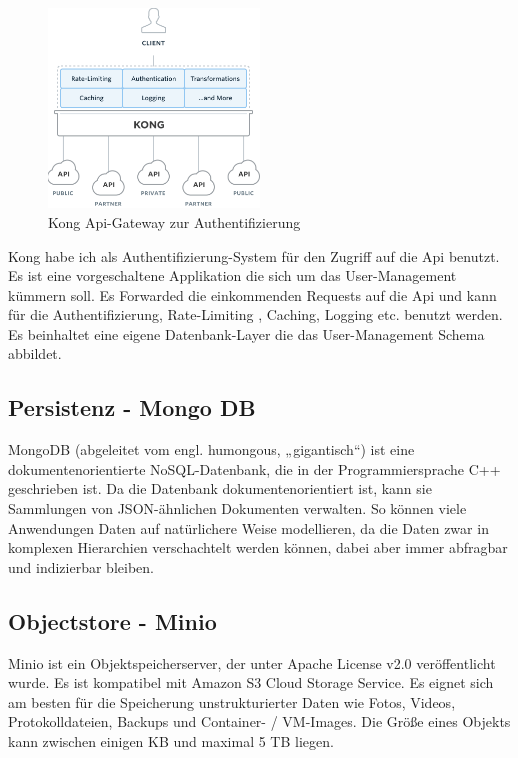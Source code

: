 \documentclass[12pt]{article}
\begin{document}
\begin{figure}[h!]
  \centering
  \includegraphics[width=0.5\textwidth]{images/kong_arch2.png}
  \caption{Kong Api-Gateway zur Authentifizierung}
  \label{}
\end{figure}

Kong habe ich als Authentifizierung-System für den Zugriff auf die Api benutzt. Es ist eine vorgeschaltene Applikation die sich um das User-Management kümmern soll. Es Forwarded die einkommenden Requests auf die Api und kann für die Authentifizierung, Rate-Limiting , Caching, Logging etc. benutzt werden.
Es beinhaltet eine eigene Datenbank-Layer die das User-Management Schema abbildet.




\subsection{Persistenz - Mongo DB }

MongoDB \cite{MONGODB} (abgeleitet vom engl. humongous, „gigantisch“) ist eine dokumentenorientierte NoSQL-Datenbank, die in der Programmiersprache C++ geschrieben ist. Da die Datenbank dokumentenorientiert ist, kann sie Sammlungen von JSON-ähnlichen Dokumenten verwalten. So können viele Anwendungen Daten auf natürlichere Weise modellieren, da die Daten zwar in komplexen Hierarchien verschachtelt werden können, dabei aber immer abfragbar und indizierbar bleiben.

\subsection{Objectstore - Minio }

Minio \cite{MINIO} ist ein Objektspeicherserver, der unter Apache License v2.0 veröffentlicht wurde. Es ist kompatibel mit Amazon S3 Cloud Storage Service. Es eignet sich am besten für die Speicherung unstrukturierter Daten wie Fotos, Videos, Protokolldateien, Backups und Container- / VM-Images. Die Größe eines Objekts kann zwischen einigen KB und maximal 5 TB liegen.
\end{document}

